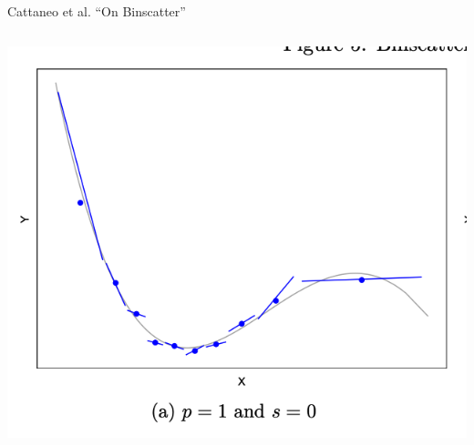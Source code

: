 \documentclass[notes,11pt, aspectratio=169]{beamer}
\begin{document}
\begin{frame}{Cattaneo et al. ``On Binscatter''}
\begin{columns}[T]
\begin{column}{.5\textwidth}
{      \includegraphics[width=\linewidth]{binscatter_crump_bins2.png}
      }
  \end{column}
\end{columns}
  
\end{frame}
\end{document}
